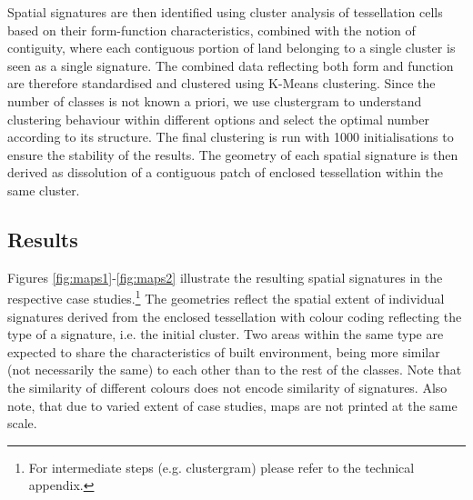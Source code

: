 
Spatial signatures are then identified using cluster analysis of tessellation cells
based on their form-function characteristics, combined with the notion of contiguity,
where each contiguous portion of land belonging to a single cluster is seen as a single
signature.
The combined data reflecting both form and function are therefore standardised and
clustered using K-Means clustering. Since the number of classes is not known a priori,
we use clustergram \citep{schonlau2002clustergram} to understand clustering behaviour
within different options and select the optimal number according to its structure.
The final clustering is run with 1000 initialisations to ensure the stability of the
results.
The geometry of each spatial signature is then derived as dissolution of a contiguous
patch of enclosed tessellation within the same cluster.


\subsection{Results}

Figures \ref{fig:maps1}-\ref{fig:maps2} illustrate the resulting spatial signatures in the respective case
studies.\footnote{For intermediate steps (e.g. clustergram) please refer to the
technical appendix.} The geometries reflect the spatial extent of individual signatures
derived from the enclosed tessellation
with colour coding reflecting the type of a signature, i.e. the initial cluster. Two
areas within the same type are expected to share the characteristics of built
environment, being more similar (not necessarily the same) to each other than to the
rest of the classes. Note that the similarity of different colours does not encode
similarity of signatures. Also note, that due to varied extent of case studies, maps are
not printed at the same scale.

